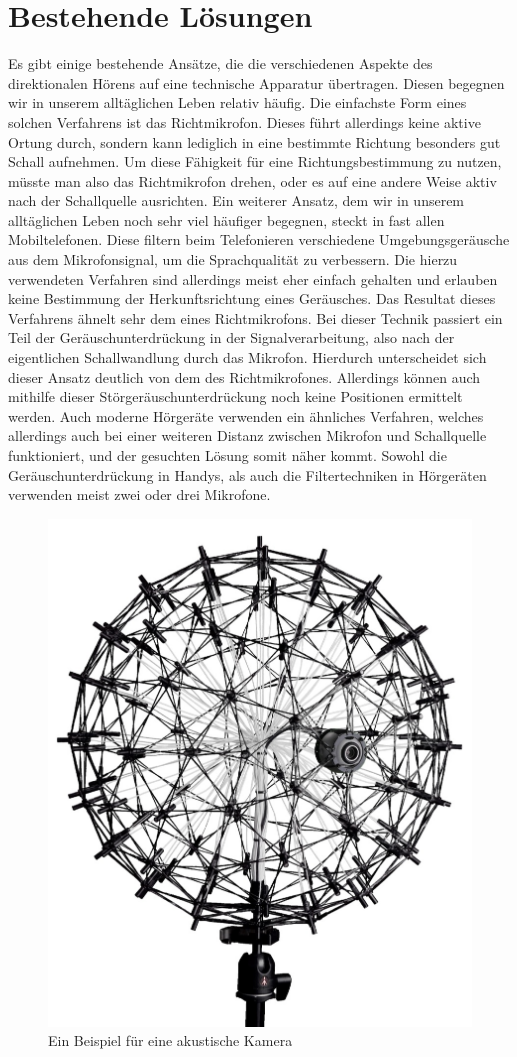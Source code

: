 \section{Bestehende Lösungen}
  Es gibt einige bestehende Ansätze, die die verschiedenen Aspekte des direktionalen Hörens auf eine technische Apparatur übertragen. Diesen begegnen wir in unserem alltäglichen Leben relativ häufig. Die einfachste Form eines solchen Verfahrens ist das Richtmikrofon. Dieses führt allerdings keine aktive Ortung durch, sondern kann lediglich in eine bestimmte Richtung besonders gut Schall aufnehmen. Um diese Fähigkeit für eine Richtungsbestimmung zu nutzen, müsste man also das Richtmikrofon drehen, oder es auf eine andere Weise aktiv nach der Schallquelle ausrichten. Ein weiterer Ansatz, dem wir in unserem alltäglichen Leben noch sehr viel häufiger begegnen, steckt in fast allen Mobiltelefonen. Diese filtern beim Telefonieren verschiedene Umgebungsgeräusche aus dem Mikrofonsignal, um die Sprachqualität zu verbessern. Die hierzu verwendeten Verfahren sind allerdings meist eher einfach gehalten und erlauben keine Bestimmung der Herkunftsrichtung eines Geräusches. Das Resultat dieses Verfahrens ähnelt sehr dem eines Richtmikrofons. Bei dieser Technik passiert ein Teil der Geräuschunterdrückung in der Signalverarbeitung, also nach der eigentlichen Schallwandlung durch das Mikrofon. Hierdurch unterscheidet sich dieser Ansatz deutlich von dem des Richtmikrofones. Allerdings können auch mithilfe dieser Störgeräuschunterdrückung noch keine Positionen ermittelt werden. Auch moderne Hörgeräte verwenden ein ähnliches Verfahren, welches allerdings auch bei einer weiteren Distanz zwischen Mikrofon und Schallquelle funktioniert, und der gesuchten Lösung somit näher kommt. Sowohl die Geräuschunterdrückung in Handys, als auch die Filtertechniken in Hörgeräten verwenden meist zwei oder drei Mikrofone.\\
     \begin{figure}
     	\centering
        \includegraphics[width=0.5\linewidth]{img/akusticCamera}
     	\caption{Ein Beispiel für eine akustische Kamera \cite{camera}}
     	\label{fig:camera}
     \end{figure}
